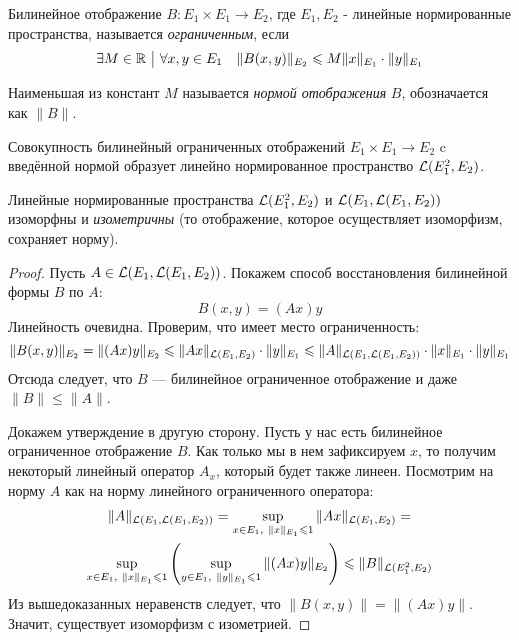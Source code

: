 \begin{definition}
    Билинейное отображение $B\colon E_1 \times E_1 \to E_2$, где  $E_1, E_2$ - линейные нормированные пространства, называется \textit{ограниченным}, если 
    \[
        \exists M \in \mathbb{R} \ \big|\  \forall x, y \in E_1 \quad \|B(x, y)\|_{E_2} \leqslant M \|x\|_{E_1} \cdot \|y\|_{E_1}
    \]
\end{definition}

\begin{definition}
    Наименьшая из констант $M$ называется \textit{нормой отображения} $B$, обозначается как $\|B\|$.
\end{definition}

\begin{note}
	Совокупность билинейный ограниченных отображений $E_1 \times E_1 \to E_2$ c введённой нормой образует линейно нормированное пространство $\mathcal{L}(E_1^2, E_2)$.
\end{note}

\begin{proposition}
    Линейные нормированные пространства $\mathcal{L}(E_1^2, E_2)$ и $\mathcal{L}(E_1, \mathcal{L}(E_1, E_2))$ изоморфны и \textit{изометричны} (то отображение, которое осуществляет изоморфизм, сохраняет норму).
\end{proposition}

\begin{proof}
    Пусть $A \in \mathcal{L}(E_1, \mathcal{L}(E_1, E_2))$. Покажем способ восстановления билинейной формы $B$ по $A$:
    \[
        B(x, y)=(Ax)y
    \]
    Линейность очевидна. Проверим, что имеет место ограниченность:
    \[
        \|B(x, y)\|_{E_2}=\|(Ax)y\|_{E_2} \leqslant \|Ax\|_{\mathcal{L}(E_1, E_2)} \cdot \|y\|_{E_1} \leqslant \|A\|_{\mathcal{L}(E_1, \mathcal{L}(E_1, E_2))} \cdot \|x\|_{E_1} \cdot \|y\|_{E_1}
    \]
    Отсюда следует, что $B$ --- билинейное ограниченное отображение и даже $\|B\| \leq \|A\|$.
    
    Докажем утверждение в другую сторону. Пусть у нас есть билинейное ограниченное отображение $B$. Как только мы в нем зафиксируем $x$, то получим некоторый линейный оператор $A_x$, который будет также линеен. Посмотрим на норму $A$ как на норму линейного ограниченного оператора:
    \begin{multline*}
        \|A\|_{\Lin(E_1, \Lin(E_1, E_2))} = \sup_{x \in E_1,\ \|x\|_{E_1} \leq 1} \|A x\|_{\Lin(E_1, E_2)} =
        \\
        \sup_{x \in E_1,\ \|x\|_{E_1} \leq 1} \ps{\sup_{y \in E_1,\ \|y\|_{E_1} \leq 1} \|(Ax)y \|_{E_2}} \leq \|B\|_{\Lin(E_1^2, E_2)}
    \end{multline*}
    Из вышедоказанных неравенств следует, что $\|B(x, y)\| = \|(Ax)y\|$. Значит, существует изоморфизм с изометрией.
\end{proof}

